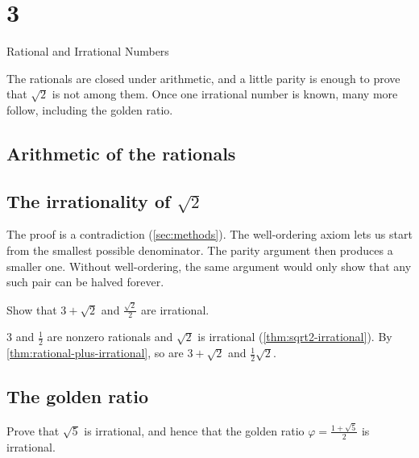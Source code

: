 \chapter{3}{Rational and Irrational Numbers}

The rationals are closed under arithmetic, and a little parity is enough to
prove that $\sqrt2$ is not among them. Once one irrational number is known,
many more follow, including the golden ratio.

\section{Arithmetic of the rationals}\label{sec:rational-arithmetic}



\section{The irrationality of \texorpdfstring{$\sqrt2$}{sqrt 2}}\label{sec:sqrt2}



\begin{remark}
  The proof is a contradiction (\cref{sec:methods}). The well-ordering axiom
  lets us start from the smallest possible denominator. The parity argument
  then produces a smaller one. Without well-ordering, the same argument would
  only show that any such pair can be halved forever.
\end{remark}



\begin{exercise}\label{ex:three-plus-root2}
  Show that $3 + \sqrt2$ and $\frac{\sqrt2}{2}$ are irrational.
\end{exercise}

\begin{solution}
  $3$ and $\frac12$ are nonzero rationals and $\sqrt2$ is irrational
  (\cref{thm:sqrt2-irrational}). By \cref{thm:rational-plus-irrational}, so
  are $3 + \sqrt2$ and $\frac12\sqrt2$.
\end{solution}

\section{The golden ratio}\label{sec:golden-ratio}

\begin{exercise}\label{ex:sqrt5}
  Prove that $\sqrt5$ is irrational, and hence that the golden ratio
  $\varphi = \frac{1 + \sqrt5}{2}$ is irrational.
\end{exercise}

